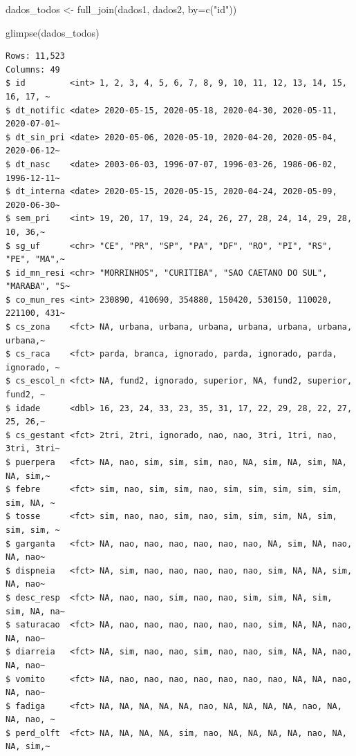 \documentclass[
  letterpaper,
  DIV=11,
  numbers=noendperiod]{scrreprt}
\newenvironment{Shaded}{\begin{snugshade}}{\end{snugshade}}
\newcommand{\AttributeTok}[1]{\textcolor[rgb]{0.40,0.45,0.13}{#1}}
\newcommand{\FunctionTok}[1]{\textcolor[rgb]{0.28,0.35,0.67}{#1}}
\newcommand{\NormalTok}[1]{\textcolor[rgb]{0.00,0.23,0.31}{#1}}
\newcommand{\OtherTok}[1]{\textcolor[rgb]{0.00,0.23,0.31}{#1}}
\newcommand{\StringTok}[1]{\textcolor[rgb]{0.13,0.47,0.30}{#1}}
\begin{document}
\begin{Shaded}
\begin{Highlighting}[]
\NormalTok{dados\_todos }\OtherTok{\textless{}{-}} \FunctionTok{full\_join}\NormalTok{(dados1, dados2, }\AttributeTok{by=}\FunctionTok{c}\NormalTok{(}\StringTok{"id"}\NormalTok{)) }

\FunctionTok{glimpse}\NormalTok{(dados\_todos)}
\end{Highlighting}
\end{Shaded}

\begin{verbatim}
Rows: 11,523
Columns: 49
$ id         <int> 1, 2, 3, 4, 5, 6, 7, 8, 9, 10, 11, 12, 13, 14, 15, 16, 17, ~
$ dt_notific <date> 2020-05-15, 2020-05-18, 2020-04-30, 2020-05-11, 2020-07-01~
$ dt_sin_pri <date> 2020-05-06, 2020-05-10, 2020-04-20, 2020-05-04, 2020-06-12~
$ dt_nasc    <date> 2003-06-03, 1996-07-07, 1996-03-26, 1986-06-02, 1996-12-11~
$ dt_interna <date> 2020-05-15, 2020-05-15, 2020-04-24, 2020-05-09, 2020-06-30~
$ sem_pri    <int> 19, 20, 17, 19, 24, 24, 26, 27, 28, 24, 14, 29, 28, 10, 36,~
$ sg_uf      <chr> "CE", "PR", "SP", "PA", "DF", "RO", "PI", "RS", "PE", "MA",~
$ id_mn_resi <chr> "MORRINHOS", "CURITIBA", "SAO CAETANO DO SUL", "MARABA", "S~
$ co_mun_res <int> 230890, 410690, 354880, 150420, 530150, 110020, 221100, 431~
$ cs_zona    <fct> NA, urbana, urbana, urbana, urbana, urbana, urbana, urbana,~
$ cs_raca    <fct> parda, branca, ignorado, parda, ignorado, parda, ignorado, ~
$ cs_escol_n <fct> NA, fund2, ignorado, superior, NA, fund2, superior, fund2, ~
$ idade      <dbl> 16, 23, 24, 33, 23, 35, 31, 17, 22, 29, 28, 22, 27, 25, 26,~
$ cs_gestant <fct> 2tri, 2tri, ignorado, nao, nao, 3tri, 1tri, nao, 3tri, 3tri~
$ puerpera   <fct> NA, nao, sim, sim, sim, nao, NA, sim, NA, sim, NA, NA, sim,~
$ febre      <fct> sim, nao, sim, sim, nao, sim, sim, sim, sim, sim, sim, NA, ~
$ tosse      <fct> sim, nao, nao, sim, nao, sim, sim, sim, NA, sim, sim, sim, ~
$ garganta   <fct> NA, nao, nao, nao, nao, nao, nao, NA, sim, NA, nao, NA, nao~
$ dispneia   <fct> NA, sim, nao, nao, nao, nao, nao, sim, NA, NA, sim, NA, nao~
$ desc_resp  <fct> NA, nao, nao, sim, nao, nao, sim, sim, NA, sim, sim, NA, na~
$ saturacao  <fct> NA, nao, nao, nao, nao, nao, nao, sim, NA, NA, nao, NA, nao~
$ diarreia   <fct> NA, sim, nao, nao, sim, nao, nao, sim, NA, NA, nao, NA, nao~
$ vomito     <fct> NA, nao, nao, nao, nao, nao, nao, nao, NA, NA, nao, NA, nao~
$ fadiga     <fct> NA, NA, NA, NA, NA, nao, NA, NA, NA, NA, nao, NA, NA, nao, ~
$ perd_olft  <fct> NA, NA, NA, NA, sim, nao, NA, NA, NA, NA, nao, NA, NA, sim,~

\end{verbatim}
\end{document}
